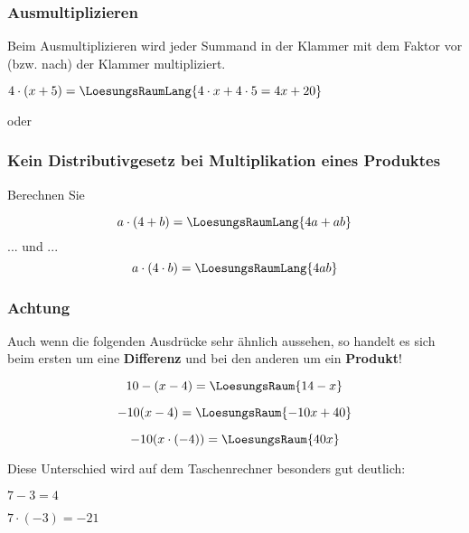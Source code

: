 \newpage

\subsubsection{Ausmultiplizieren}
Beim Ausmultiplizieren wird jeder Summand in der Klammer mit dem
Faktor vor (bzw. nach) der Klammer multipliziert.
\begin{beispiel}{}{}
  $4\cdot (x + 5) =\LoesungsRaumLang{4\cdot x + 4\cdot 5 = 4x + 20}$
\end{beispiel}

\begin{beispiel}{}{}
oder \TRAINER{\\}
\end{beispiel}

\subsubsection{Kein Distributivgesetz bei Multiplikation eines Produktes}
Berechnen Sie

$$a\cdot{}(4+b) = \LoesungsRaumLang{4a + ab}$$
 ... und ...
$$ a\cdot{}(4\cdot{}b) = \LoesungsRaumLang{4ab} $$

\newpage

\subsubsection{Achtung}
Auch wenn die folgenden Ausdrücke sehr ähnlich aussehen, so
handelt es sich beim ersten um eine \textbf{Differenz} und bei den anderen um
ein \textbf{Produkt}!

$$10-(x-4) =\LoesungsRaum{14-x}$$

$$-10(x-4) = \LoesungsRaum{-10x + 40}$$

$$-10(x\cdot{}(-4)) = \LoesungsRaum{40x}$$

Diese Unterschied wird auf dem Taschenrechner besonders gut deutlich:

    $ 7 - 3 = 4$

\vspace{3mm}
   $ 7\cdot{}(-3) = -21$


